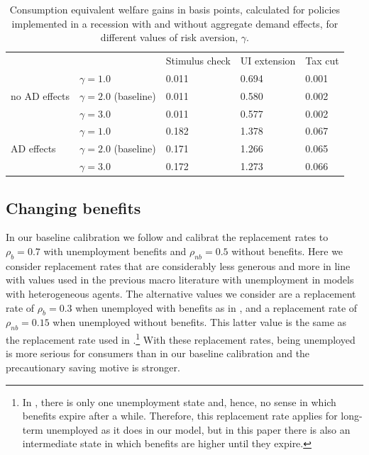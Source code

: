 \documentclass[../HAFiscal]{subfiles}
\begin{document}
\begin{table}[]
	\begin{center}
		\begin{tabular}{@{}lllll@{}}
			\toprule
			&                    & Stimulus check & UI extension & Tax cut \\ \cmidrule(l){1-5} 
			\multirow{3}{*}{no AD effects}            	& $\gamma = 1.0$ 			& 0.011          & 0.694        & 0.001   \\
												 		& $\gamma = 2.0$ (baseline) & 0.011          & 0.580        & 0.002   \\
			          									& $\gamma = 3.0$ 			& 0.011          & 0.577        & 0.002   \\ \cmidrule(l){1-5} 
			\multirow{3}{*}{AD effects}					& $\gamma = 1.0$   	 		& 0.182          & 1.378        & 0.067   \\
														& $\gamma = 2.0$ (baseline) & 0.171          & 1.266        & 0.065   \\
														& $\gamma = 3.0$    		& 0.172          & 1.273        & 0.066   \\ \cmidrule(l){1-5} 
		\end{tabular}
		\caption{Consumption equivalent welfare gains in basis points, calculated for policies implemented in a recession with and without aggregate demand effects, for different values of risk aversion, $\gamma$.}
		\label{tab:robustness_gamma_results}
	\end{center}
\end{table}


\subsection{Changing benefits} 
\label{sec:robust_benefits} 

In our baseline calibration we follow \cite{rothstein2017scraping} and calibrat the replacement rates to $\rho_b=0.7$ with unemployment benefits and $\rho_{nb}=0.5$ without benefits. Here we consider replacement rates that are considerably less generous and more in line with values used in the previous macro literature with unemployment in models with heterogeneous agents. The alternative values we consider are a replacement rate of $\rho_{b}=0.3$ when unemployed with benefits as in \cite{carroll2020modeling}, and a replacement rate of $\rho_{nb}=0.15$ when unemployed without benefits. This latter value is the same as the replacement rate used in \cite{den2010computational}.\footnote{In \cite{den2010computational}, there is only one unemployment state and, hence, no sense in which benefits expire after a while. Therefore, this replacement rate applies for long-term unemployed as it does in our model, but in this paper there is also an intermediate state in which benefits are higher until they expire.} With these replacement rates, being unemployed is more serious for consumers than in our baseline calibration and the precautionary saving motive is stronger. 
\end{document}
